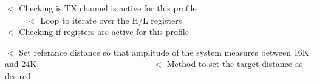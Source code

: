 $<$ Checking is TX channel is active for this profile ~\newline
~\newline
~\newline
~\newline
~\newline
~\newline
~\newline
~\newline
~\newline
~\newline
~\newline
~\newline
~\newline
~\newline
~\newline
~\newline
~\newline
~\newline
~\newline
 $<$ Loop to iterate over the H/L registers ~\newline
~\newline
~\newline
~\newline
~\newline
~\newline
~\newline
~\newline
~\newline
~\newline
~\newline
~\newline
~\newline
~\newline
~\newline
~\newline
~\newline
~\newline
 $<$ Checking if registers are active for this profile

$<$ Set referance distance so that amplitude of the system measures between 16K and 24K ~\newline
~\newline
~\newline
~\newline
~\newline
~\newline
~\newline
~\newline
~\newline
~\newline
~\newline
~\newline
~\newline
~\newline
~\newline
~\newline
 $<$ Method to set the target distance as desired


